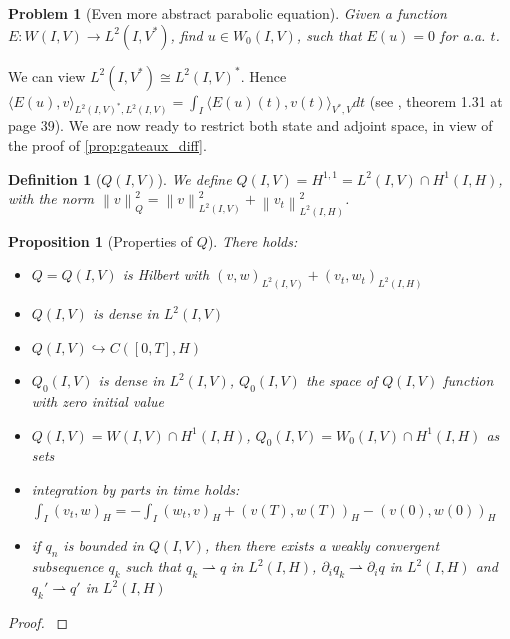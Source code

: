 \documentclass[english,a4paper,9pt,oneside]{scrbook}	%
\theoremstyle{break}
\newtheorem{defn}[equation]{Definition}
\newtheorem{prop}[equation]{Proposition}
\newtheorem{pb}[equation]{Problem}
\newenvironment{mproof}[1][\proofname]{%
  \begin{proof}[#1]$ $\par\nobreak\ignorespaces
}{%
  \end{proof}
}
\renewcommand*{\proofname}{Proof}
\theoremstyle{remark}
\newcommand{\ds}{\displaystyle}
\newcommand{\norm}[1]{\left\lVert#1\right\rVert}
\newcommand{\emb}{\hookrightarrow}
\newcommand{\weakc}{\rightharpoonup}
\begin{document}
\begin{appendices}
\begin{pb}[Even more abstract parabolic equation]
\label{pb:more_abstr_par}
Given a function $E: W(I,V)\rightarrow L^2(I,V^*)$, find $u\in W_0(I,V)$, such that $E(u)=0$ for a.a. $t$.
\end{pb}
 
We can view $L^2(I,V^*)\cong L^2(I,V)^*$. Hence $\langle E(u), v\rangle_{L^2(I,V)^*, L^2(I,V)}=\int_I \langle E(u)(t),v(t) \rangle_{V^*,V} dt$ (see \cite{hinze}, theorem 1.31 at page 39). We are now ready to restrict both state and adjoint space, in view of the proof of \cref{prop:gateaux_diff}.

\begin{defn}[$Q(I,V)$]
\label{def:Q}
We define $Q(I,V)=H^{1,1}=L^2(I,V)\cap H^1(I,H)$, with the norm $\norm{v}_Q^2=\norm{v}_{L^2(I,V)}^2 + \norm{v_t}_{L^2(I,H)}^2$.
\end{defn}

\begin{prop}[Properties of $Q$]
\label{prop:Q}
There holds:
\begin{itemize}
	\item $Q=Q(I,V)$ is Hilbert with $(v,w)_{L^2(I,V)} + (v_t,w_t)_{L^2(I,H)}$ 
	\item $Q(I,V)$ is dense in $L^2(I,V)$
	\item $Q(I,V)\emb C([0,T],H)$
	\item $Q_0(I,V)$ is dense in $L^2(I,V)$, $Q_0(I,V)$ the space of $Q(I,V)$ function with zero initial value
	\item $Q(I,V) = W(I,V)\cap H^1(I,H)$, $Q_0(I,V) =  W_0(I,V)\cap H^1(I,H)$ as sets
	\item integration by parts in time holds: $\ds \int_I(v_t,w)_H = -\int_I(w_t,v)_H +(v(T),w(T))_H-(v(0),w(0))_H$
	\item if $q_n$ is bounded in $Q(I,V)$, then there exists a weakly convergent subsequence $q_k$ such that $q_k\weakc q$ in $L^2(I,H)$, $\partial_i q_k\weakc \partial_i q$ in $L^2(I,H)$ and $q_k'\weakc q'$ in $L^2(I,H)$
\end{itemize}
\end{prop}
\begin{mproof}

%
%
%


\end{mproof}
\end{appendices}
\end{document}
